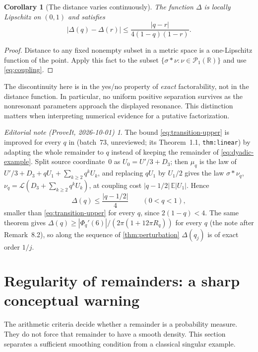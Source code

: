 \documentclass[11pt,letterpaper]{article}
\newtheorem{corollary}[theorem]{Corollary}
\theoremstyle{definition}
\theoremstyle{remark}
\newtheorem*{ednotelater}{Editorial note (ProveIt, 2026-10-01)}
\newcommand{\R}{\mathbb R}
\newcommand{\E}{\mathbb E}
\newcommand{\Law}{\mathcal L}
\numberwithin{equation}{section}
\begin{document}
\begin{corollary}[The distance varies continuously]\label{cor:distance-continuity}
The function $\Delta$ is locally Lipschitz on $(0,1)$ and satisfies
\[
 |\Delta(q)-\Delta(r)|\le\frac{|q-r|}{4(1-q)(1-r)}.
\]
\end{corollary}
\begin{proof}
Distance to any fixed nonempty subset in a metric space is a one-Lipschitz function of the point. Apply this fact to the subset $\{\sigma*\nu:\nu\in\mathcal P_1(\R)\}$ and use \eqref{eq:coupling}.
\end{proof}
The discontinuity here is in the yes/no property of \emph{exact} factorability, not in the distance function. In particular, no uniform positive separation survives as the nonresonant parameters approach the displayed resonance. This distinction matters when interpreting numerical evidence for a putative factorization.
\begin{ednotelater}
The bound \eqref{eq:transition-upper} is improved for every $q$ in
(batch~73, unreviewed; its Theorem~1.1, \texttt{thm:linear}) by adapting
the whole remainder to $q$ instead of keeping the remainder of
\eqref{eq:dyadic-example}. Split source coordinate~$0$ as
$U_0=U'/3+D_3$; then $\mu_q$ is the law of
$U'/3+D_3+qU_1+\sum_{k\ge2}q^kU_k$, and replacing $qU_1$ by $U_1/2$
gives the law $\sigma*\nu_q$, $\nu_q=\Law(D_3+\sum_{k\ge2}q^kU_k)$, at
coupling cost $|q-1/2|\,\E|U_1|$. Hence
\[
 \Delta(q)\le\frac{|q-1/2|}{4}\qquad(0<q<1),
\]
smaller than \eqref{eq:transition-upper} for every $q$, since
$2(1-q)<4$. The same theorem gives
$\Delta(q)\ge|\Phi_q'(6)|/(2\pi(1+12\pi R_q))$ for every $q$ (the note
after Remark~8.2), so along the sequence of \cref{thm:perturbation}
$\Delta(q_j)$ is of exact order $1/j$.
\end{ednotelater}

\section{Regularity of remainders: a sharp conceptual warning}\label{sec:regularity}
The arithmetic criteria decide whether a remainder is a probability measure. They do not force that remainder to have a smooth density. This section separates a sufficient smoothing condition from a classical singular example.
\end{document}
